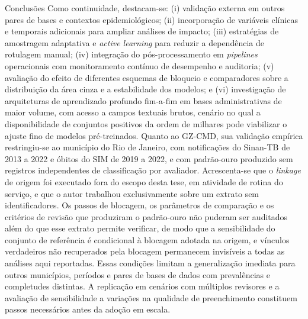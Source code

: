 \begin{chapter}{Conclusões}
Como continuidade, destacam-se: (i) validação externa em outros pares de bases e contextos epidemiológicos; (ii) incorporação de variáveis clínicas e temporais adicionais para ampliar análises de impacto; (iii) estratégias de amostragem adaptativa e \textit{active learning} para reduzir a dependência de rotulagem manual; (iv) integração do pós-processamento em \textit{pipelines} operacionais com monitoramento contínuo de desempenho e auditoria; (v) avaliação do efeito de diferentes esquemas de bloqueio e comparadores sobre a distribuição da área cinza e a estabilidade dos modelos; e (vi) investigação de arquiteturas de aprendizado profundo fim-a-fim \cite{Mudgal2018deepmatcher,Li2020ditto} em bases administrativas de maior volume, com acesso a campos textuais brutos, cenário no qual a disponibilidade de conjuntos positivos da ordem de milhares pode viabilizar o ajuste fino de modelos pré-treinados.
Quanto ao GZ-CMD, sua validação empírica restringiu-se ao município do Rio de Janeiro, com notificações do Sinan-TB de 2013 a 2022 e óbitos do SIM de 2019 a 2022, e com padrão-ouro produzido sem registros independentes de classificação por avaliador. Acrescenta-se que o \textit{linkage} de origem foi executado fora do escopo desta tese, em atividade de rotina do serviço, e que o autor trabalhou exclusivamente sobre um extrato sem identificadores. Os passos de blocagem, os parâmetros de comparação e os critérios de revisão que produziram o padrão-ouro não puderam ser auditados além do que esse extrato permite verificar, de modo que a sensibilidade do conjunto de referência é condicional à blocagem adotada na origem, e vínculos verdadeiros não recuperados pela blocagem permanecem invisíveis a todas as análises aqui reportadas. Essas condições limitam a generalização imediata para outros municípios, períodos e pares de bases de dados com prevalências e completudes distintas. A replicação em cenários com múltiplos revisores e a avaliação de sensibilidade a variações na qualidade de preenchimento constituem passos necessários antes da adoção em escala.


\end{chapter}
